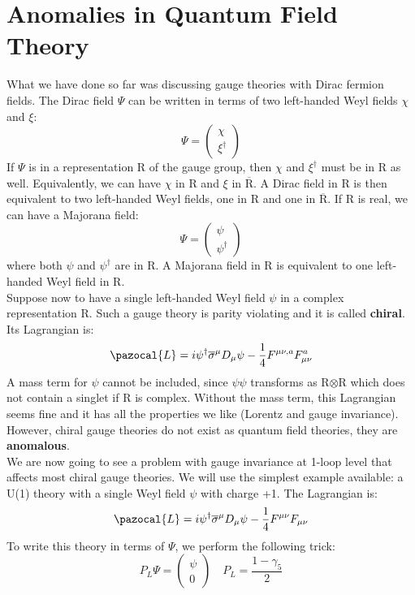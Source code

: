 \documentclass[../main.tex]{subfiles}
\begin{document}
\section{Anomalies in Quantum Field Theory}
What we have done so far was discussing gauge theories with Dirac fermion fields. The Dirac field $\Psi$ can be written in terms of two left-handed Weyl fields $\chi$ and $\xi$:
\[
\Psi=\left(\begin{array}{c}
     \chi \\
     \xi^\dagger 
\end{array}\right)
\]
If $\Psi$ is in a representation R of the gauge group, then $\chi$ and $\xi^\dagger$ must be in R as well. Equivalently, we can have $\chi$ in R and $\xi$ in $\overline{\text{R}}$. A Dirac field in R is then equivalent to two left-handed Weyl fields, one in R and one in $\overline{\text{R}}$. If R is real, we can have a Majorana field:
\[
\Psi=\left(\begin{array}{c}
     \psi \\
     \psi^\dagger 
\end{array}\right)
\]
where both $\psi$ and $\psi^\dagger$ are in R. A Majorana field in R is equivalent to one left-handed Weyl field in R.\\
Suppose now to have a single left-handed Weyl field $\psi$ in a complex representation R. Such a gauge theory is parity violating and it is called \textbf{chiral}. Its Lagrangian is:
\[
\pazocal{L}=i\psi^\dagger\overline{\sigma}^\mu D_\mu\psi-\frac{1}{4}F^{\mu\nu,a}F_{\mu\nu}^a
\]
A mass term for $\psi$ cannot be included, since $\psi\psi$ transforms as R$\otimes$R which does not contain a singlet if R is complex. Without the mass term, this Lagrangian seems fine and it has all the properties we like (Lorentz and gauge invariance). However, chiral gauge theories do not exist as quantum field theories, they are \textbf{anomalous}.\\
We are now going to see a problem with gauge invariance at 1-loop level that affects most chiral gauge theories. We will use the simplest example available: a U(1) theory with a single Weyl field $\psi$ with charge +1. The Lagrangian is:
\[
\pazocal{L}=i\psi^\dagger\overline{\sigma}^\mu D_\mu\psi-\frac{1}{4}F^{\mu\nu}F_{\mu\nu}
\]
To write this theory in terms of $\Psi$, we perform the following trick:
\[
P_L\Psi=\left(\begin{array}{c}
     \psi \\
     0 
\end{array}\right)
\quad
P_L=\frac{1-\gamma_5}{2}
\]
\end{document}
